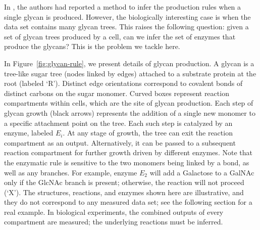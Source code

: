 In \cite{Jaiman440792}, the authors had reported a method to infer the production rules when a single glycan is produced. However, the biologically interesting case is when the data set contains many glycan trees. This raises the following question: given a set of glycan trees produced by a cell,
can we infer the set of enzymes that produce the glycans? This is the problem we tackle here.


In Figure~\ref{fig:glycan-rule}, we present details of glycan production. A glycan is a tree-like sugar tree (nodes linked by edges) attached to a substrate protein at the root (labeled `R'). Distinct edge orientations correspond to covalent bonds of distinct carbons on the sugar monomer. Curved boxes represent reaction compartments within cells, which are the site of glycan production. Each step of glycan growth (black arrows) represents the addition of a single new monomer to a specific attachment point on the tree. Each such step is catalyzed by an enzyme, labeled $E_i$. At any stage of growth, the tree can exit the reaction compartment as an output. Alternatively, it can be passed to a subsequent reaction compartment for further growth driven by different enzymes. Note that the enzymatic rule is sensitive to the two monomers being linked by a bond, as well as any branches. For example, enzyme $E_2$ will add a Galactose to a GalNAc only if the GlcNAc branch is present; otherwise, the reaction will not proceed (`X'). The structures, reactions, and enzymes shown here are illustrative, and they do not correspond to any measured data set; see the following section for a real example. In biological experiments, the combined outputs of every compartment are measured; the underlying reactions must be inferred.

%

